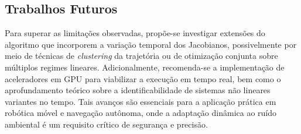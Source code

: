 \documentclass[journal]{IEEEtran}
\begin{document}
\subsection{Trabalhos Futuros}

Para superar as limitações observadas, propõe-se investigar extensões do algoritmo que incorporem a variação temporal dos Jacobianos, possivelmente por meio de técnicas de \textit{clustering} da trajetória ou de otimização conjunta sobre múltiplos regimes lineares. Adicionalmente, recomenda-se a implementação de aceleradores em GPU para viabilizar a execução em tempo real, bem como o aprofundamento teórico sobre a identificabilidade de sistemas não lineares variantes no tempo. Tais avanços são essenciais para a aplicação prática em robótica móvel e navegação autônoma, onde a adaptação dinâmica ao ruído ambiental é um requisito crítico de segurança e precisão.
\end{document}
